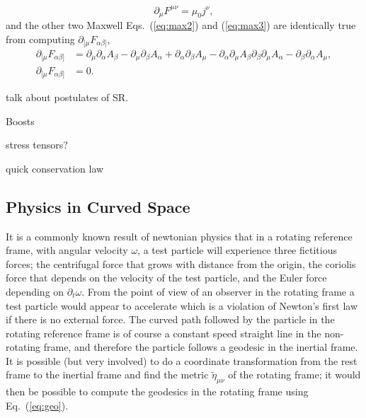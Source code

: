 \begin{equation}
\partial_\mu F^{\mu\nu} = \mu_0 j^\nu,
\end{equation}
and the other two Maxwell Eqs.~(\ref{eq:max2}) and (\ref{eq:max3}) are identically true from computing $\partial_{[\mu} F_{\alpha\beta]}$,
\begin{align}
\partial_{[\mu} F_{\alpha\beta]} &= \partial_\mu\partial_\alpha A_\beta - \partial_\mu\partial_\beta A_\alpha
+\partial_\alpha\partial_\beta A_\mu - \partial_\alpha\partial_\mu A_\beta
\partial_\beta\partial_\mu A_\alpha - \partial_\beta\partial_\alpha A_\mu ,\\\partial_{[\mu} F_{\alpha\beta]} &=0.
\end{align}

talk about postulates of SR.

Boosts

stress tensors?

quick conservation law

\subsection{Physics in Curved Space}
It is a commonly known result of newtonian physics that in a rotating reference frame, with angular velocity $\omega$, a test particle will experience three fictitious forces; the centrifugal force that grows with distance from the origin, the coriolis force that depends on the velocity of the test particle, and the Euler force depending on $\partial_t \omega$. From the point of view of an observer in the rotating frame a test particle would appear to accelerate which is a violation of Newton's first law if there is no external force. The curved path followed by the particle in the rotating reference frame is of course a constant speed straight line in the non-rotating frame, and therefore the particle follows a geodesic in the inertial frame. It is possible (but very involved) to do a coordinate transformation from the rest frame to the inertial frame and find the metric $\tilde{\eta}_{\mu\nu}$ of the rotating frame; it would then be possible to compute the geodesics in the rotating frame using Eq.~(\ref{eq:geo}).

